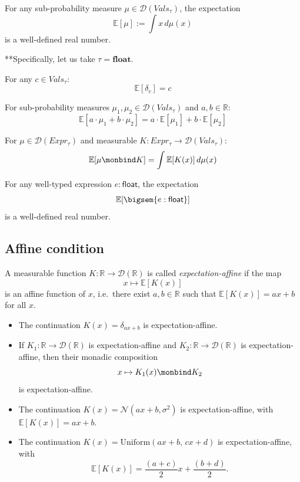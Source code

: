 \begin{lemma}
  For any sub-probability measure $\mu \in \mathcal{D}(Vals_{\tau})$, the expectation
  \[
    \mathbb{E}[\mu] := \int x \, d\mu(x)
  \]
  is a well-defined real number.

  **Specifically, let us take $\tau = \mathbf{float}$.
\end{lemma}

\begin{lemma}
  For any $c \in Vals_{\tau}$:
  \[
    \mathbb{E}[\delta_c] = c
  \]
\end{lemma}

\begin{lemma}
  For sub-probability measures $\mu_1, \mu_2 \in \mathcal{D}(Vals_{\tau})$ and $a, b \in \mathbb{R}$:
  \[
    \mathbb{E}[a \cdot \mu_1 + b \cdot \mu_2] = a \cdot \mathbb{E}[\mu_1] + b \cdot \mathbb{E}[\mu_2]
  \]
\end{lemma}

\begin{lemma}
  For $\mu \in \mathcal{D}(Expr_\tau)$ and measurable $K : Expr_\tau \to \mathcal{D}(Vals_{\tau})$:
  \[
    \mathbb{E}[\mu \monbind K] = \int \mathbb{E}[K(x)] \, d\mu(x)
  \]
\end{lemma}

\begin{lemma}
  For any well-typed expression $e : \mathsf{float}$, the expectation
  \[
    \mathbb{E}[\bigsem{e : \mathsf{float}}] 
  \]
  is a well-defined real number.
\end{lemma}

\subsection{Affine condition}

\begin{definition}
  A measurable function $K : \mathbb{R} \to \mathcal{D}(\mathbb{R})$ is called \emph{expectation-affine} if the map
  \[
    x \mapsto \mathbb{E}[K(x)]
  \]
  is an affine function of $x$, i.e.\ there exist $a, b \in \mathbb{R}$ such that $\mathbb{E}[K(x)] = ax + b$ for all $x$.
\end{definition}

\begin{itemize}
  \item The continuation $K(x) = \delta_{ax+b}$ is expectation-affine. 
  \item If $K_1 : \mathbb{R} \to \mathcal{D}(\mathbb{R})$ is expectation-affine and $K_2 : \mathbb{R} \to \mathcal{D}(\mathbb{R})$ is expectation-affine, then their monadic composition
  \[
    x \mapsto K_1(x) \monbind K_2
  \]
  is expectation-affine.
  \item The continuation $K(x) = \mathcal{N}(ax + b, \sigma^2)$ is expectation-affine, with $\mathbb{E}[K(x)] = ax + b$.
  \item The continuation $K(x) = \mathrm{Uniform}(ax + b,\, cx + d)$ is expectation-affine, with
  \[
    \mathbb{E}[K(x)] = \frac{(a+c)}{2} x + \frac{(b+d)}{2}.
  \]
\end{itemize}

